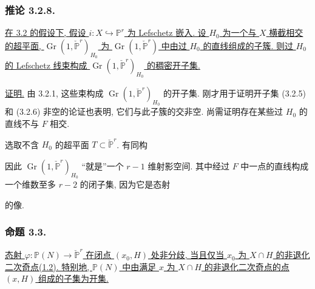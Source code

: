\subsubsection*{推论 3.2.8.}
\underline{在 3.2 的假设下, 假设 $i:X\hookrightarrow\mathbb P^r$ 为 Lefschetz 嵌入. 设 $H_0$ 为一个与 $X$ 横截相交的超平面, $\operatorname{Gr}(1,\check{\mathbb P}^{r})_{H_0}$ 为 $\operatorname{Gr}(1,\check{\mathbb P}^{r})$ 中由过 $H_0$ 的直线组成的子簇. 则过 $H_0$ 的 Lefschetz 线束构成 $\operatorname{Gr}(1,\check{\mathbb P}^{r})_{H_0}$ 的稠密开子集.}

\noindent\underline{证明.}
由 3.2.1, 这些束构成 $\operatorname{Gr}(1,\check{\mathbb P}^{r})_{H_0}$ 的开子集. 刚才用于证明开子集 (3.2.5) 和 (3.2.6) 非空的论证也表明, 它们与此子簇的交非空. 尚需证明存在某些过 $H_0$ 的直线不与 $F$ 相交.

选取不含 $H_0$ 的超平面 $T\subset\check{\mathbb P}^{r}$. 有同构
\begin{center}
\end{center}
因此 $\operatorname{Gr}(1,\check{\mathbb P}^{r})_{H_0}$ “就是”一个 $r-1$ 维射影空间. 其中经过 $F$ 中一点的直线构成一个维数至多 $r-2$ 的闭子集, 因为它是态射
\begin{center}
\end{center}
的像.

\subsubsection*{命题 3.3.}
\underline{态射 $\varphi:\mathbb P(N)\to\check{\mathbb P}^{r}$ 在闭点 $(x_0,H)$ 处非分歧, 当且仅当 $x_0$ 为 $X\cap H$ 的非退化二次奇点(1.2). 特别地, $\mathbb P(N)$ 中由满足 $x$ 为 $X\cap H$ 的非退化二次奇点的点 $(x,H)$ 组成的子集为开集.}
